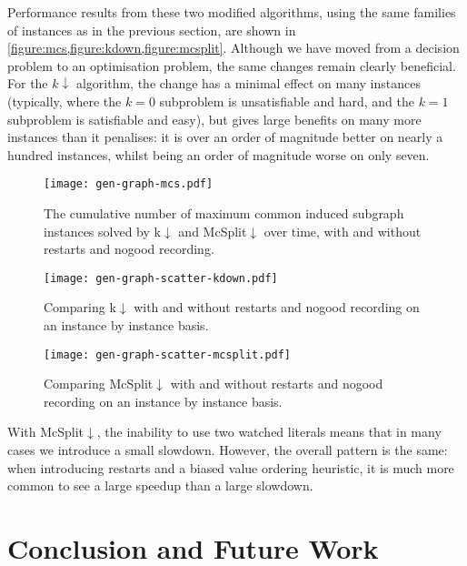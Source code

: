 \documentclass[letterpaper]{article} %
\begin{document}
Performance results from these two modified algorithms, using the same families of instances as in
the previous section, are shown in \cref{figure:mcs,figure:kdown,figure:mcsplit}. Although we have
moved from a decision problem to an optimisation problem, the same changes remain clearly
beneficial. For the $k{\downarrow}$ algorithm, the change has a minimal effect on many instances
(typically, where the $k = 0$ subproblem is unsatisfiable and hard, and the $k = 1$ subproblem is
satisfiable and easy), but gives large benefits on many more instances than it penalises: it is over
an order of magnitude better on nearly a hundred instances, whilst being an order of magnitude worse
on only seven.

\begin{figure}[p]
    \centering
    \texttt{[image: gen-graph-mcs.pdf]}
    \caption{The cumulative number of maximum common induced subgraph instances solved by
    k${\downarrow}$ and McSplit${\downarrow}$ over time, with and without restarts and nogood
    recording.}\label{figure:mcs}
\end{figure}

\begin{figure}[p]
    \centering
    \texttt{[image: gen-graph-scatter-kdown.pdf]}
    \caption{Comparing k${\downarrow}$ with and without restarts and nogood recording on an instance
    by instance basis.}\label{figure:kdown}
\end{figure}

\begin{figure}[p]
    \centering
    \texttt{[image: gen-graph-scatter-mcsplit.pdf]}
    \caption{Comparing McSplit${\downarrow}$ with and without restarts and nogood recording on an instance
    by instance basis.}\label{figure:mcsplit}
\end{figure}


With McSplit${\downarrow}$, the inability to use two watched literals means that in many cases we
introduce a small slowdown. However, the overall pattern is the same: when introducing restarts and
a biased value ordering heuristic, it is much more common to see a large speedup than a large
slowdown.

\section{Conclusion and Future Work}
\end{document}
